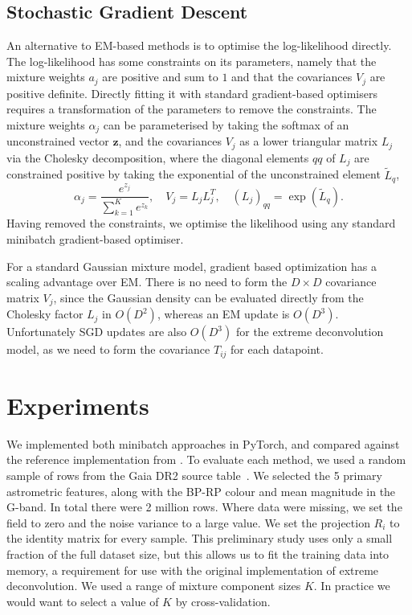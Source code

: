 \documentclass{article}
\begin{document}
\subsection{Stochastic Gradient Descent}

An alternative to EM-based methods is to optimise the log-likelihood directly.
The log-likelihood has some constraints on its parameters, namely that the mixture weights $a_j$ are positive and sum to $1$ and that the covariances $V_j$ are positive definite.
Directly fitting it with standard gradient-based optimisers requires a transformation of the parameters to remove the constraints.
The mixture weights $\alpha_j$ can be parameterised by taking the softmax of an unconstrained vector $\mathbf{z}$, and the covariances $V_j$ as a lower triangular matrix $L_j$ via the Cholesky decomposition, where the diagonal elements $qq$ of $L_j$ are constrained positive by taking the exponential of the unconstrained element $\tilde{L}_q$,
\begin{equation}
\alpha_j = \frac{e^{z_j}}{\sum_{k=1}^K e^{z_k}}, \quad
V_j = L_jL_j^T, \quad
(L_j)_{qq} = \exp({\tilde{L}_q}).
\end{equation}
Having removed the constraints, we optimise the likelihood using any standard minibatch gradient-based optimiser.

For a standard Gaussian mixture model, gradient based optimization has a scaling advantage over EM\@. There is no need to form the $D\!\times\!D$ covariance matrix $V_j$, since the Gaussian density can be evaluated directly from the Cholesky factor $L_j$ in $O(D^2)$, whereas an EM update is $O(D^3)$.
Unfortunately SGD updates are also $O(D^3)$ for the extreme deconvolution model, as we need to form the covariance $T_{ij}$ for each datapoint.

\section{Experiments}

We implemented both minibatch approaches in PyTorch, and compared against the reference implementation from \citet{bovyExtremeDeconvolutionInferring2011}.
To evaluate each method, we used a random sample of rows from the Gaia DR2 source table~\cite{brownGaiaDataRelease2018}.
We selected the 5 primary astrometric features, along with the BP-RP colour and mean magnitude in the G-band.
In total there were 2 million rows.
Where data were missing, we set the field to zero and the noise variance to a large value.
We set the projection $R_i$ to the identity matrix for every sample.
This preliminary study uses only a small fraction of the full dataset size, but this allows us to fit the training data into memory, a requirement for use with the original implementation of extreme deconvolution.
We used a range of mixture component sizes $K$.
In practice we would want to select a value of $K$ by cross-validation.
\end{document}
